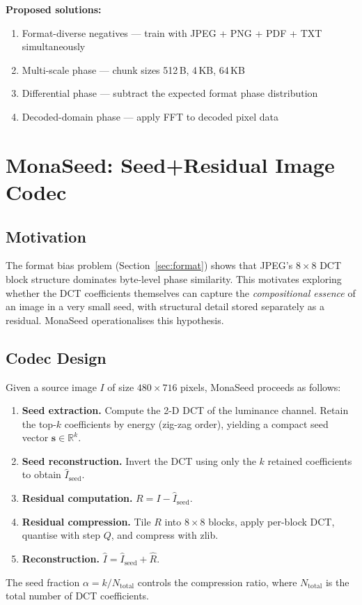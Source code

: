 \documentclass[10pt,twocolumn]{article}
\begin{document}
\noindent\textbf{Proposed solutions:}
\begin{enumerate}\setlength{\itemsep}{0pt}
\item Format-diverse negatives --- train with JPEG + PNG + PDF + TXT
  simultaneously
\item Multi-scale phase --- chunk sizes 512\,B, 4\,KB, 64\,KB
\item Differential phase --- subtract the expected format phase distribution
\item Decoded-domain phase --- apply FFT to decoded pixel data
\end{enumerate}

\section{MonaSeed: Seed+Residual Image Codec}\label{sec:monaseed}

\subsection{Motivation}
The format bias problem (Section~\ref{sec:format}) shows that JPEG's $8\times8$
DCT block structure dominates byte-level phase similarity. This motivates
exploring whether the DCT coefficients themselves can capture the \emph{compositional
essence} of an image in a very small seed, with structural detail stored
separately as a residual. MonaSeed operationalises this hypothesis.

\subsection{Codec Design}
Given a source image $I$ of size $480\times716$ pixels, MonaSeed proceeds as
follows:
\begin{enumerate}\setlength{\itemsep}{2pt}
\item \textbf{Seed extraction.} Compute the 2-D DCT of the luminance channel.
  Retain the top-$k$ coefficients by energy (zig-zag order), yielding a
  compact seed vector $\mathbf{s}\in\mathbb{R}^k$.
\item \textbf{Seed reconstruction.} Invert the DCT using only the $k$
  retained coefficients to obtain $\hat{I}_{\text{seed}}$.
\item \textbf{Residual computation.} $R = I - \hat{I}_{\text{seed}}$.
\item \textbf{Residual compression.} Tile $R$ into $8\times8$ blocks, apply
  per-block DCT, quantise with step $Q$, and compress with zlib.
\item \textbf{Reconstruction.} $\hat{I} = \hat{I}_{\text{seed}} +
  \hat{R}$.
\end{enumerate}
The seed fraction $\alpha = k / N_{\text{total}}$ controls the compression
ratio, where $N_{\text{total}}$ is the total number of DCT coefficients.
\end{document}

